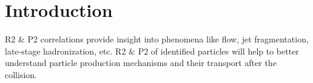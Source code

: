 \documentclass[ALICE,manyauthors]{ALICE_analysis_notes}
\begin{document}
\section[Introduction]{Introduction}
R2 \& P2 correlations provide insight into phenomena like flow, jet fragmentation, late-stage hadronization, etc. R2 \& P2 of identified particles will help to better understand particle production mechanisms and their transport after the collision.
\end{document}
